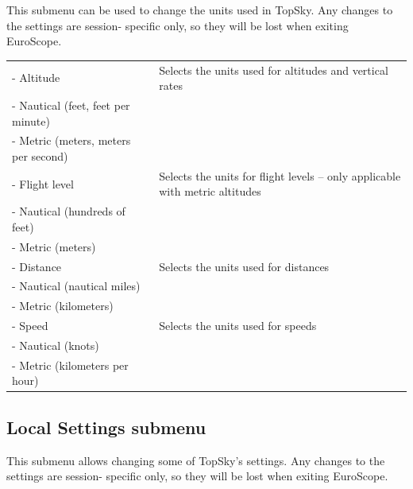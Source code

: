 \documentclass[11pt,a4paper]{memoir}
\begin{document}
This submenu can be used to change the units used in TopSky. Any changes to the settings are session- specific only, so they will be lost when exiting EuroScope.

\begin{tabular}{l l}
    - Altitude & Selects the units used for altitudes and vertical rates\\
    - Nautical (feet, feet per minute)\\
    - Metric (meters, meters per second)\\
    - Flight level & Selects the units for flight levels – only applicable with metric altitudes\\
    - Nautical (hundreds of feet)\\
    - Metric (meters)\\
    - Distance & Selects the units used for distances\\
    - Nautical (nautical miles)\\
    - Metric (kilometers)\\
    - Speed & Selects the units used for speeds\\
    - Nautical (knots)\\
    - Metric (kilometers per hour)\\
\end{tabular}

\subsection*{Local Settings submenu}
\label{menu:localset}

This submenu allows changing some of TopSky’s settings. Any changes to the settings are session-
specific only, so they will be lost when exiting EuroScope.
\medskip
\end{document}
